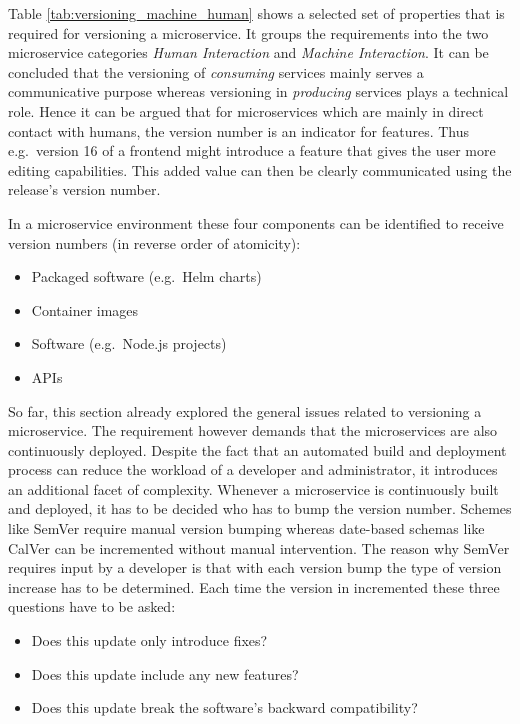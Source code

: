 
Table \ref{tab:versioning_machine_human} shows a selected set of properties
that is required for versioning a microservice. It groups the requirements into
the two microservice categories \textit{Human Interaction} and \textit{Machine
Interaction}. It can be concluded that the versioning of \textit{consuming}
services mainly serves a communicative purpose whereas versioning in
\textit{producing} services plays a technical role. Hence it can be argued that
for microservices which are mainly in direct contact with humans, the version
number is an indicator for features. Thus e.g.\ version 16 of a frontend might
introduce a feature that gives the user more editing capabilities. This added
value can then be clearly communicated using the release's version number.

In a microservice environment these four components can be identified to
receive version numbers (in reverse order of atomicity):

\begin{itemize}
  \item Packaged software (e.g.\ Helm charts)
  \item Container images
  \item Software (e.g.\ Node.js projects)
  \item \acp{API}
\end{itemize}

So far, this section already explored the general issues related to versioning
a microservice. The requirement however demands that the microservices are also
continuously deployed. Despite the fact that an automated build and deployment
process can reduce the workload of a developer and administrator, it introduces
an additional facet of complexity. Whenever a microservice is continuously
built and deployed, it has to be decided who has to bump the version number.
Schemes like SemVer require manual version bumping whereas date-based schemas
like CalVer can be incremented without manual intervention. The reason why
SemVer requires input by a developer is that with each version bump the type of
version increase has to be determined. Each time the version in incremented
these three questions have to be asked:

\begin{itemize}
  \item Does this update only introduce fixes?
  \item Does this update include any new features?
  \item Does this update break the software's backward compatibility?
\end{itemize}

